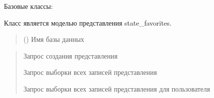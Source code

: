 \documentclass[letterpaper,10pt,russian]{sphinxmanual}
\begin{document}
\begin{fulllineitems}
\label{\detokenize{database.sqlite3_interface.views:database.sqlite3_interface.views.view_favorites.ViewFavorites}}
\pysigstartsignatures
{}
\pysigstopsignatures
\sphinxAtStartPar
Базовые классы: {\hyperref[\detokenize{database.sqlite3_interface.views:database.sqlite3_interface.views.view.View}]{}}

\sphinxAtStartPar
Класс является моделью представления state\_favorites.
\begin{quote}\begin{description}
\sphinxAtStartPar
{} () \textendash{} Имя базы данных

\end{description}\end{quote}
\begin{description}
\begin{quote}\begin{description}
\sphinxAtStartPar
Запрос создания представления

\sphinxAtStartPar
Запрос выборки всех записей представления

\sphinxAtStartPar
Запрос выборки всех записей представления для пользователя

\end{description}\end{quote}


\end{description}
\end{fulllineitems}
\end{document}
